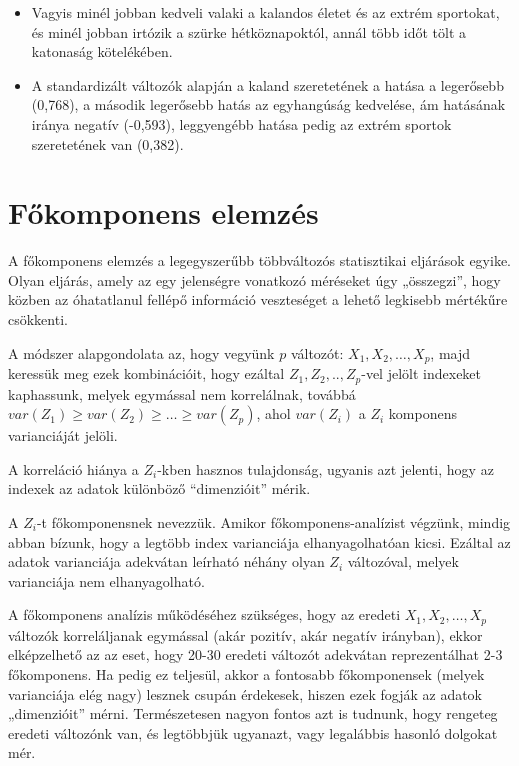 \documentclass[
  letterpaper,
]{krantz}
\begin{document}
\begin{itemize}
\item
  Vagyis minél jobban kedveli valaki a kalandos életet és az extrém
  sportokat, és minél jobban irtózik a szürke hétköznapoktól, annál több
  időt tölt a katonaság kötelékében.
\item
  A standardizált változók alapján a kaland szeretetének a hatása a
  legerősebb (0,768), a második legerősebb hatás az egyhangúság
  kedvelése, ám hatásának iránya negatív (-0,593), leggyengébb hatása
  pedig az extrém sportok szeretetének van (0,382).
\end{itemize}


\hypertarget{sec-fokomponens-elemzes}{%
\chapter{Főkomponens elemzés}\label{sec-fokomponens-elemzes}}

A főkomponens elemzés a legegyszerűbb többváltozós statisztikai
eljárások egyike. Olyan eljárás, amely az egy jelenségre vonatkozó
méréseket úgy „összegzi'', hogy közben az óhatatlanul fellépő információ
veszteséget a lehető legkisebb mértékűre csökkenti.

A módszer alapgondolata az, hogy vegyünk \(p\) változót:
\(X_1,X_2,\dots,X_p\), majd keressük meg ezek kombinációit, hogy ezáltal
\(Z_1,Z_2,..,Z_p\)-vel jelölt indexeket kaphassunk, melyek egymással nem
korrelálnak, továbbá
\(var(Z_1 )\geq var(Z_2 )\geq \dots \geq var(Z_p)\), ahol \(var(Z_i)\) a
\(Z_i\) komponens varianciáját jelöli.

A korreláció hiánya a \(Z_i\)-kben hasznos tulajdonság, ugyanis azt
jelenti, hogy az indexek az adatok különböző ``dimenzióit'' mérik.

A \(Z_i\)-t főkomponensnek nevezzük. Amikor főkomponens-analízist
végzünk, mindig abban bízunk, hogy a legtöbb index varianciája
elhanyagolhatóan kicsi. Ezáltal az adatok varianciája adekvátan leírható
néhány olyan \(Z_i\) változóval, melyek varianciája nem elhanyagolható.

A főkomponens analízis működéséhez szükséges, hogy az eredeti
\(X_1,X_2,\dots,X_p\) változók korreláljanak egymással (akár pozitív,
akár negatív irányban), ekkor elképzelhető az az eset, hogy 20-30
eredeti változót adekvátan reprezentálhat 2-3 főkomponens. Ha pedig ez
teljesül, akkor a fontosabb főkomponensek (melyek varianciája elég nagy)
lesznek csupán érdekesek, hiszen ezek fogják az adatok „dimenzióit''
mérni. Természetesen nagyon fontos azt is tudnunk, hogy rengeteg eredeti
változónk van, és legtöbbjük ugyanazt, vagy legalábbis hasonló dolgokat
mér.
\end{document}
